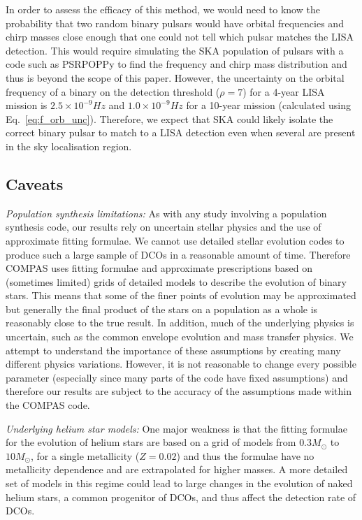 In order to assess the efficacy of this method, we would need to know the probability that two random binary pulsars would have orbital frequencies and chirp masses close enough that one could not tell which pulsar matches the LISA detection. This would require simulating the SKA population of pulsars with a code such as PSRPOPPy to find the frequency and chirp mass distribution and thus is beyond the scope of this paper. However, the uncertainty on the orbital frequency of a binary on the detection threshold ($\rho = 7$) for a 4-year LISA mission is $2.5 \times 10^{-9} \unit{Hz}$ and $1.0 \times 10^{-9} \unit{Hz}$ for a 10-year mission (calculated using Eq.~\ref{eq:f_orb_unc}). Therefore, we expect that SKA could likely isolate the correct binary pulsar to match to a LISA detection even when several are present in the sky localisation region.

\subsection{Caveats}\label{sec:caveats}
\textit{Population synthesis limitations:} As with any study involving a population synthesis code, our results rely on uncertain stellar physics and the use of approximate fitting formulae. We cannot use detailed stellar evolution codes to produce such a large sample of DCOs in a reasonable amount of time. Therefore COMPAS uses fitting formulae and approximate prescriptions based on (sometimes limited) grids of detailed models to describe the evolution of binary stars. This means that some of the finer points of evolution may be approximated but generally the final product of the stars on a population as a whole is reasonably close to the true result. In addition, much of the underlying physics is uncertain, such as the common envelope evolution and mass transfer physics. We attempt to understand the importance of these assumptions by creating many different physics variations. However, it is not reasonable to change every possible parameter (especially since many parts of the code have fixed assumptions) and therefore our results are subject to the accuracy of the assumptions made within the COMPAS code.

\textit{Underlying helium star models:} One major weakness is that the \citet{Hurley+2000} fitting formulae for the evolution of helium stars are based on a grid of models from $0.3 \unit{M_{\odot}}$ to $10 \unit{M_{\odot}}$, for a single metallicity ($Z= 0.02$) and thus the formulae have no metallicity dependence and are extrapolated for higher masses. A more detailed set of models in this regime could lead to large changes in the evolution of naked helium stars, a common progenitor of DCOs, and thus affect the detection rate of DCOs.

